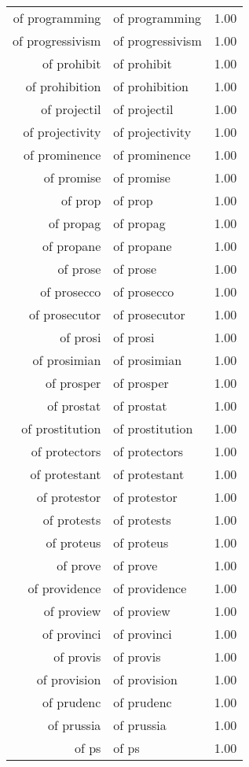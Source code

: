 \begin{table}[ht]
\begin{tabular}{rlr}
  of programming & of programming & 1.00 \\ 
  of progressivism & of progressivism & 1.00 \\ 
  of prohibit & of prohibit & 1.00 \\ 
  of prohibition & of prohibition & 1.00 \\ 
  of projectil & of projectil & 1.00 \\ 
  of projectivity & of projectivity & 1.00 \\ 
  of prominence & of prominence & 1.00 \\ 
  of promise & of promise & 1.00 \\ 
  of prop & of prop & 1.00 \\ 
  of propag & of propag & 1.00 \\ 
  of propane & of propane & 1.00 \\ 
  of prose & of prose & 1.00 \\ 
  of prosecco & of prosecco & 1.00 \\ 
  of prosecutor & of prosecutor & 1.00 \\ 
  of prosi & of prosi & 1.00 \\ 
  of prosimian & of prosimian & 1.00 \\ 
  of prosper & of prosper & 1.00 \\ 
  of prostat & of prostat & 1.00 \\ 
  of prostitution & of prostitution & 1.00 \\ 
  of protectors & of protectors & 1.00 \\ 
  of protestant & of protestant & 1.00 \\ 
  of protestor & of protestor & 1.00 \\ 
  of protests & of protests & 1.00 \\ 
  of proteus & of proteus & 1.00 \\ 
  of prove & of prove & 1.00 \\ 
  of providence & of providence & 1.00 \\ 
  of proview & of proview & 1.00 \\ 
  of provinci & of provinci & 1.00 \\ 
  of provis & of provis & 1.00 \\ 
  of provision & of provision & 1.00 \\ 
  of prudenc & of prudenc & 1.00 \\ 
  of prussia & of prussia & 1.00 \\ 
  of ps & of ps & 1.00 \\ 

\end{tabular}
\end{table}
